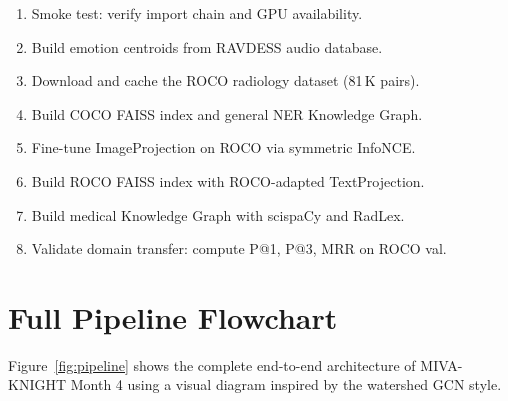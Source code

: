 \documentclass[12pt, a4paper]{article}
\theoremstyle{definition}
\theoremstyle{plain}
\theoremstyle{remark}
\begin{document}
\begin{enumerate}[label=\textbf{Step \arabic*.},leftmargin=3cm]
  \item Smoke test: verify import chain and GPU availability.
  \item Build emotion centroids from RAVDESS audio database.
  \item Download and cache the ROCO radiology dataset (81\,K pairs).
  \item Build COCO FAISS index and general NER Knowledge Graph.
  \item Fine-tune ImageProjection on ROCO via symmetric InfoNCE.
  \item Build ROCO FAISS index with ROCO-adapted TextProjection.
  \item Build medical Knowledge Graph with scispaCy and RadLex.
  \item Validate domain transfer: compute P@1, P@3, MRR on ROCO val.
\end{enumerate}

\section{Full Pipeline Flowchart}
\label{sec:flowchart}

Figure~\ref{fig:pipeline} shows the complete end-to-end architecture of MIVA-KNIGHT Month 4 using a visual diagram inspired by the watershed GCN style.
\end{document}

